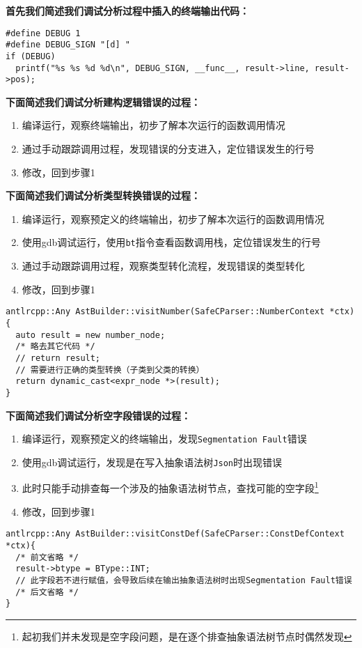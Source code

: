 \documentclass[../main.tex]{subfiles}
\begin{document}
\textbf{首先我们简述我们调试分析过程中插入的终端输出代码：}

\begin{mdframed}
  \begin{verbatim}
#define DEBUG 1
#define DEBUG_SIGN "[d] "
if (DEBUG)
  printf("%s %s %d %d\n", DEBUG_SIGN, __func__, result->line, result->pos);
  \end{verbatim}
\end{mdframed}


\textbf{下面简述我们调试分析建构逻辑错误的过程：}

\begin{enumerate}
	\item 编译运行，观察终端输出，初步了解本次运行的函数调用情况
	\item 通过手动跟踪调用过程，发现错误的分支进入，定位错误发生的行号
	\item 修改，回到步骤1
\end{enumerate}


\textbf{下面简述我们调试分析类型转换错误的过程：}

\begin{enumerate}
	\item 编译运行，观察预定义的终端输出，初步了解本次运行的函数调用情况
	\item 使用gdb调试运行，使用\texttt{bt}指令查看函数调用栈，定位错误发生的行号
	\item 通过手动跟踪调用过程，观察类型转化流程，发现错误的类型转化
	\item 修改，回到步骤1
\end{enumerate}

\begin{mdframed}
  \begin{verbatim}
antlrcpp::Any AstBuilder::visitNumber(SafeCParser::NumberContext *ctx) {
  auto result = new number_node;
  /* 略去其它代码 */
  // return result;
  // 需要进行正确的类型转换（子类到父类的转换）
  return dynamic_cast<expr_node *>(result);
}
  \end{verbatim}
\end{mdframed}


\textbf{下面简述我们调试分析空字段错误的过程：}

\begin{enumerate}
	\item 编译运行，观察预定义的终端输出，发现\texttt{Segmentation Fault}错误
	\item 使用gdb调试运行，发现是在写入抽象语法树\texttt{Json}时出现错误
	\item 此时只能手动排查每一个涉及的抽象语法树节点，查找可能的空字段\footnote{起初我们并未发现是空字段问题，是在逐个排查抽象语法树节点时偶然发现}
	\item 修改，回到步骤1
\end{enumerate}

\begin{mdframed}
	\begin{verbatim}
antlrcpp::Any AstBuilder::visitConstDef(SafeCParser::ConstDefContext *ctx){
  /* 前文省略 */
  result->btype = BType::INT;
  // 此字段若不进行赋值，会导致后续在输出抽象语法树时出现Segmentation Fault错误
  /* 后文省略 */
}
  \end{verbatim}
\end{mdframed}
\end{document}
